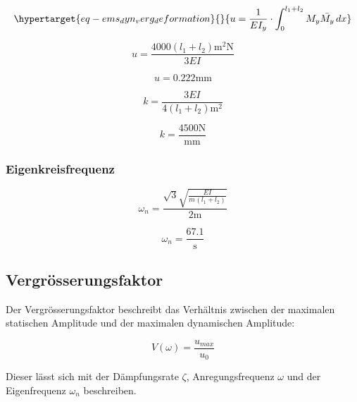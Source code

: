 \documentclass[
  letterpaper,
  DIV=11]{scrreprt}
\begin{document}
\begin{equation}\protect\hypertarget{eq-ems_dyn_verg_deformation}{}{
u = \frac{1}{E I_y} \cdot \int_{0}^{l_1+l_2} M_y\bar{M_y} \,dx
}\label{eq-ems_dyn_verg_deformation}\end{equation}

\begin{equation}u = \frac{4000 \left(l_{1} + l_{2}\right) \text{m}^{2} \text{N}}{3 EI}\end{equation}

\begin{equation}u = 0.222 \text{mm}\end{equation}

\begin{equation}k = \frac{3 EI}{4 \left(l_{1} + l_{2}\right) \text{m}^{2}}\end{equation}

\begin{equation}k = \frac{4500 \text{N}}{\text{mm}}\end{equation}

\hypertarget{eigenkreisfrequenz-3}{%
\subsubsection{Eigenkreisfrequenz}\label{eigenkreisfrequenz-3}}

\begin{equation}\omega_{n} = \frac{\sqrt{3} \sqrt{\frac{EI}{m_{} \left(l_{1} + l_{2}\right)}}}{2 \text{m}}\end{equation}

\begin{equation}\omega_{n} = \frac{67.1}{\text{s}}\end{equation}

\hypertarget{vergruxf6sserungsfaktor}{%
\subsection{Vergrösserungsfaktor}\label{vergruxf6sserungsfaktor}}

Der Vergrösserungsfaktor beschreibt das Verhältnis zwischen der
maximalen statischen Amplitude und der maximalen dynamischen Amplitude:

\[V(\omega) = \frac{u_{max}}{u_0}\]

Dieser lässt sich mit der Dämpfungsrate \(\zeta\), Anregungsfrequenz
\(\omega\) und der Eigenfrequenz \(\omega_n\) beschreiben.
\end{document}
